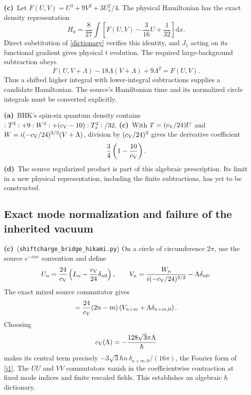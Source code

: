 \documentclass[11pt,a4paper]{article}
\newcommand{\A}{\textbf{(a)}\ }
\newcommand{\C}{\textbf{(c)}\ }
\newcommand{\D}{\textbf{(d)}\ }
\newcommand{\dd}{\mathrm d}
\newcommand{\file}[1]{\nolinkurl{#1}}
\newcommand{\hk}{\file{shiftcharge_bridge_hikami.py}}
\begin{document}
\C Let $F(U,V)=U^3+9V^2+3U_x^2/4$. The physical Hamiltonian has the exact
density representation
\begin{equation}
 H_0=\frac8{27}\int\left[F(U,V)-\frac3{16}U+\frac1{32}\right]\dd x.
 \label{energy-map}
\end{equation}
Direct substitution of \eqref{dictionary} verifies this identity, and
$J_1$ acting on its functional gradient gives physical $t$ evolution.
The required large-background subtraction obeys
\begin{equation}
 F(U,V+\Lambda)-18\Lambda(V+\Lambda)+9\Lambda^2=F(U,V).
 \label{subtraction}
\end{equation}
Thus a shifted higher integral with lower-integral subtractions supplies a
candidate Hamiltonian. The source's Hamiltonian time and its normalized
circle integrals must be converted explicitly.

\A BHK's spin-six quantum density contains
$:T^3:+9:W^2:+(c_{\rm V}-10):T_x^2:/32$.
\C With $T=(c_{\rm V}/24)U$ and
$W=i(-c_{\rm V}/24)^{3/2}(V+\Lambda)$, division by
$(c_{\rm V}/24)^3$ gives the derivative coefficient
\begin{equation}
 \frac34\left(1-\frac{10}{c_{\rm V}}\right).
 \label{quantum-density}
\end{equation}
\D The source regularized product is part of this algebraic prescription.
Its limit in a new physical representation, including the finite subtractions,
has yet to be constructed.

\subsection{Exact mode normalization and failure of the inherited vacuum}
\C (\hk) On a circle of circumference $2\pi$, use the source
$e^{-inx}$ convention and define
\begin{equation}
 U_n=\frac{24}{c_{\rm V}}\left(L_n-\frac{c_{\rm V}}{24}\delta_{n0}\right),
 \qquad
 V_n=\frac{W_n}{i(-c_{\rm V}/24)^{3/2}}-\Lambda\delta_{n0}.
 \label{modes}
\end{equation}
The exact mixed source commutator gives
\begin{equation}
 [U_n,V_m]=\frac{24}{c_{\rm V}}(2n-m)
 \left(V_{n+m}+\Lambda\delta_{n+m,0}\right).
 \label{mixed}
\end{equation}
Choosing
\begin{equation}
 c_{\rm V}(\Lambda)=-\frac{128\sqrt3\pi\Lambda}{\hbar}
 \label{central-scaling}
\end{equation}
makes its central term precisely
$-3\sqrt3\hbar n\,\delta_{n+m,0}/(16\pi)$, the Fourier form of
\eqref{j1}. The $UU$ and $VV$ commutators vanish in the coefficientwise
contraction at fixed mode indices and finite rescaled fields.
This establishes an algebraic $\hbar$ dictionary.
\end{document}
